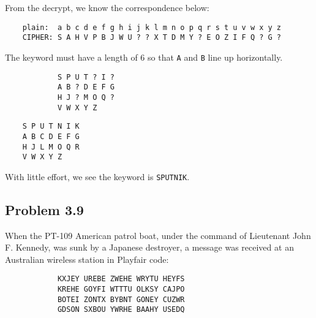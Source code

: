 \documentclass[../hw_sols.tex]{subfiles}
\begin{document}
\begin{solution}

From the decrypt, we know the correspondence below:
\begin{verbatim}
    plain:  a b c d e f g h i j k l m n o p q r s t u v w x y z
    CIPHER: S A H V P B J W U ? ? X T D M Y ? E O Z I F Q ? G ?	
\end{verbatim}

\noindent The keyword must have a length of 6 so that \verb|A| and \verb|B| 
line up horizontally.

\begin{minipage}{0.3\linewidth}
	\begin{verbatim}
            S P U T ? I ?
            A B ? D E F G
            H J ? M O Q ?
            V W X Y Z    
	\end{verbatim}
\end{minipage}
\qquad {\Huge $\Rightarrow$} \qquad
\begin{minipage}{0.3\linewidth}
	\begin{verbatim}
    S P U T N I K
    A B C D E F G
    H J L M O Q R
    V W X Y Z
	\end{verbatim}
\end{minipage}

\noindent With little effort, we see the keyword is \verb|SPUTNIK|.

\end{solution}


\newpage



\subsection*{Problem 3.9}

When the PT-109 American patrol boat, under the command of Lieutenant John F. 
Kennedy, was sunk by a Japanese destroyer, a message was received at an 
Australian wireless station in Playfair code:
\begin{verbatim}
            KXJEY UREBE ZWEHE WRYTU HEYFS
            KREHE GOYFI WTTTU OLKSY CAJPO
            BOTEI ZONTX BYBNT GONEY CUZWR
            GDSON SXBOU YWRHE BAAHY USEDQ
\end{verbatim}
\end{document}
